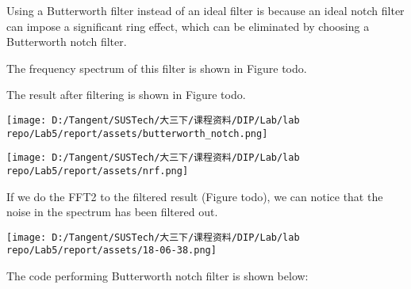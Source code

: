 \documentclass[
]{article}
\begin{document}
Using a Butterworth filter instead of an ideal filter is because an
ideal notch filter can impose a significant ring effect, which can be
eliminated by choosing a Butterworth notch filter.

The frequency spectrum of this filter is shown in Figure todo.

The result after filtering is shown in Figure todo.

\texttt{[image: D:/Tangent/SUSTech/大三下/课程资料/DIP/Lab/lab repo/Lab5/report/assets/butterworth\_notch.png]}

\texttt{[image: D:/Tangent/SUSTech/大三下/课程资料/DIP/Lab/lab repo/Lab5/report/assets/nrf.png]}

If we do the FFT2 to the filtered result (Figure todo), we can notice
that the noise in the spectrum has been filtered out.

\texttt{[image: D:/Tangent/SUSTech/大三下/课程资料/DIP/Lab/lab repo/Lab5/report/assets/18-06-38.png]}

The code performing Butterworth notch filter is shown below:
\end{document}
